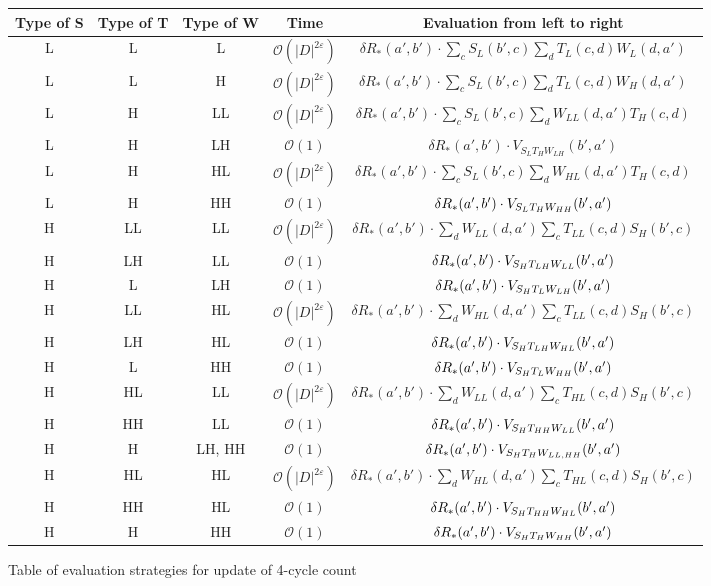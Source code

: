 \documentclass[10pt,a4paper]{article}
\begin{document}
\begin{enumerate}
\renewcommand{\figurename}{Table}
\begin{figure}	
\begin{center}
\begin{tabular}{|c|c|c|c|c|}
\hline
Type of S & Type of T & Type of W & Time & Evaluation from left to right \\ 
 \hline 
L & L & L & $\mathcal{O}(|D|^{2\varepsilon})$ &
$\delta R_*(a', b') \cdot \sum_c S_L(b', c) \sum_d T_L(c, d) W_L(d, a')$ \\ 
\hline 
L & L & H & $\mathcal{O}(|D|^{2\varepsilon})$ & $\delta R_*(a', b') \cdot \sum_c S_L(b', c) \sum_d T_L(c, d) W_H(d, a')$ \\ 
\hline 
L & H  & LL & $\mathcal{O}(|D|^{2\varepsilon})$ & $\delta R_*(a', b') \cdot \sum_c S_L(b', c) \sum_d W_{LL}(d, a') T_{H}(c, d) $ \\ 
\hline 
L & H & LH & $\mathcal{O}(1)$ & $\delta R_*(a', b') \cdot V_{S_LT_HW_{LH}}(b', a') $ \\ 
\hline 
L & H & HL & $\mathcal{O}(|D|^{2\varepsilon})$ &  $\delta R_*(a', b') \cdot \sum_c S_L(b', c) \sum_d W_{HL}(d, a') T_{H}(c, d) $ \\ 
\hline 
L & H & HH & $\mathcal{O}(1)$ & $\delta R_*(a', b') \cdot V_{S_{L}T_{H}W_{HH}}(b', a')$ \\ 
\hline 
H & LL & LL &  $\mathcal{O}(|D|^{2\varepsilon})$ &
 $\delta R_*(a', b') \cdot \sum_d W_{LL}(d, a') \sum_c T_{LL}(c, d) S_H(b', c)   $\\ 
\hline 
H & LH & LL & $\mathcal{O}(1)$ & $\delta R_*(a', b') \cdot V_{S_{H}T_{LH}W_{LL}}(b', a')$  \\ 
\hline 
H & L & LH & $\mathcal{O}(1)$  & $\delta R_*(a', b') \cdot V_{S_{H}T_{L}W_{LH}}(b', a')$ \\ 
\hline 
H & LL & HL & $\mathcal{O}(|D|^{2\varepsilon})$ &  $\delta R_*(a', b') \cdot \sum_d W_{HL}(d, a') \sum_c T_{LL}(c, d) S_H(b', c)$
\\ 
\hline 
H & LH & HL & $\mathcal{O}(1)$ & $\delta R_*(a', b') \cdot V_{S_{H}T_{LH}W_{HL}}(b', a')$ \\ 
\hline 
H & L & HH & $\mathcal{O}(1)$ & $\delta R_*(a', b') \cdot V_{S_{H}T_{L}W_{HH}}(b', a')$ \\ 
\hline 
H & HL & LL & $\mathcal{O}(|D|^{2\varepsilon})$ & $\delta R_*(a', b') \cdot \sum_d W_{LL}(d, a') \sum_c T_{HL}(c, d) S_H(b', c)$\\ 
\hline 
H & HH & LL & $\mathcal{O}(1)$ & $\delta R_*(a', b') \cdot V_{S_{H}T_{HH}W_{LL}}(b', a')$ \\ 
\hline 
H & H & LH, HH & $\mathcal{O}(1)$ & $\delta R_*(a', b') \cdot V_{S_{H}T_{H}W_{LL, HH}}(b', a')$ \\ 
\hline 
H & HL & HL & $\mathcal{O}(|D|^{2\varepsilon})$ & $\delta R_*(a', b') \cdot \sum_d W_{HL}(d, a') \sum_c T_{HL}(c, d) S_H(b', c)$\\ 
\hline 
H & HH & HL & $\mathcal{O}(1)$ & $\delta R_*(a', b') \cdot V_{S_{H}T_{HH}W_{HL}}(b', a')$ \\ 
\hline 
H & H & HH & $\mathcal{O}(1)$ & $\delta R_*(a', b') \cdot V_{S_{H}T_{H}W_{HH}}(b', a')$ \\ 
\hline 
\end{tabular} 
\caption{Table of evaluation strategies for update of 4-cycle count}
\end{center}
\label{tab:Comp}
\end{figure}

\end{enumerate}




\end{document}
